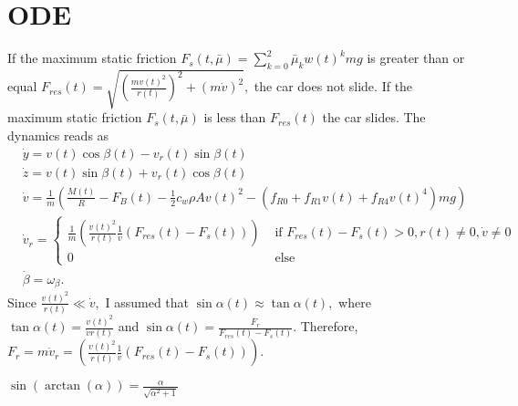 \documentclass[
10pt, %
a4paper, %
oneside, %
headinclude,footinclude, %
BCOR5mm, %
]{scrartcl}
\begin{document}
\section{ODE}
If the maximum static friction $F_s(t, \bar{\mu}) = \sum_{k=0}^2 \bar{\mu}_k w(t)^k mg $ is greater than or equal $F_{res}(t) = \sqrt{\left(\frac{mv(t)^2}{r(t)}\right)^2+ \left(m \dot{v}\right)^2},$ the car does not slide. 
If the maximum static friction $F_s(t, \bar{\mu})$ is less than $F_{res}(t)$ the car slides. 
The dynamics reads as
\begin{align*}
 &\dot{y} = v(t) \cos\beta(t) -  v_r(t)\sin \beta(t) \\
& \dot{z} = v(t) \sin\beta(t) +  v_r(t)\cos \beta(t) \\
& \dot{v} = \frac{1}{m}\left( \frac{M(t)}{R} - F_B(t) - \frac{1}{2}  c_w  \rho  A v(t)^2 -\left(f_{R0} + f_{R1} v(t) + f_{R4}v(t)^4 \right) m g\right)\\
& \dot{v}_r = \begin{cases} \frac{1}{m}\left( \frac{v(t)^2}{r(t)} \frac{1}{\dot{v}} \left(F_{res}(t)- F_{s}(t) \right) \right) & \text{ if } F_{res}(t)- F_{s}(t) > 0, r(t) \neq 0, \dot{v} \neq 0\\
0 &   \text{ else }
\end{cases}\\
& \dot{\beta} = \omega_{\beta}.
\end{align*}
 Since $\frac{v(t)^2}{r(t)} \ll \dot{v},$ I assumed that \href{http://www.wolframalpha.com/input/?i=plot+tan%28a%29+-+sin%28a%29+from+a+%3D+0..pi%2F8}{$\sin \alpha(t) \approx \tan \alpha(t),$} where 
$\tan \alpha(t) = \frac{v(t)^2}{\dot{v}r(t)}$ and $\sin \alpha(t)  = \frac{F_r}{F_{res}(t)- F_{s}(t)}.$  Therefore, $F_r = m \dot{v}_r = \left( \frac{v(t)^2}{r(t)} \frac{1}{\dot{v}} \left(F_{res}(t)- F_{s}(t) \right) \right).$ \par
\href{http://www.wolframalpha.com/input/?i=+sin%28artan%28x%29%29}{$\sin(\arctan(\alpha))= \frac{\alpha}{\sqrt{\alpha^2 +1}}$}
\end{document}
